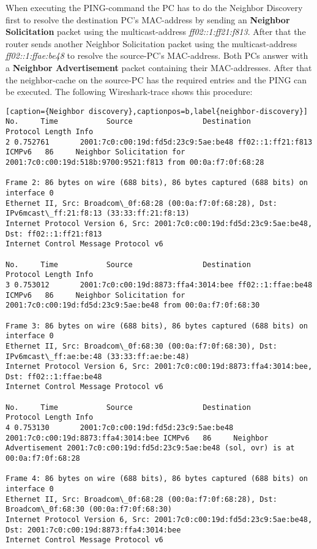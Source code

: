 When executing the PING-command the PC has to do the Neighbor Discovery first to resolve the destination PC's MAC-address by sending an \textbf{Neighbor Solicitation} packet using the multicast-address \textit{ff02::1:ff21:f813}. After that the router sends another Neighbor Solicitation packet using the multicast-address \textit{ff02::1:ffae:be48} to resolve the source-PC's MAC-address. Both PCs answer with a \textbf{Neighbor Advertisement} packet containing their MAC-addresses. After that the neighbor-cache on the source-PC has the required entries and the PING can be executed. The following Wireshark-trace shows this procedure:\\
\begin{lstlisting}[caption={Neighbor discovery},captionpos=b,label{neighbor-discovery}]
No.     Time           Source                Destination           Protocol Length Info
2 0.752761       2001:7c0:c00:19d:fd5d:23c9:5ae:be48 ff02::1:ff21:f813     ICMPv6   86     Neighbor Solicitation for 2001:7c0:c00:19d:518b:9700:9521:f813 from 00:0a:f7:0f:68:28

Frame 2: 86 bytes on wire (688 bits), 86 bytes captured (688 bits) on interface 0
Ethernet II, Src: Broadcom\_0f:68:28 (00:0a:f7:0f:68:28), Dst: IPv6mcast\_ff:21:f8:13 (33:33:ff:21:f8:13)
Internet Protocol Version 6, Src: 2001:7c0:c00:19d:fd5d:23c9:5ae:be48, Dst: ff02::1:ff21:f813
Internet Control Message Protocol v6

No.     Time           Source                Destination           Protocol Length Info
3 0.753012       2001:7c0:c00:19d:8873:ffa4:3014:bee ff02::1:ffae:be48     ICMPv6   86     Neighbor Solicitation for 2001:7c0:c00:19d:fd5d:23c9:5ae:be48 from 00:0a:f7:0f:68:30

Frame 3: 86 bytes on wire (688 bits), 86 bytes captured (688 bits) on interface 0
Ethernet II, Src: Broadcom\_0f:68:30 (00:0a:f7:0f:68:30), Dst: IPv6mcast\_ff:ae:be:48 (33:33:ff:ae:be:48)
Internet Protocol Version 6, Src: 2001:7c0:c00:19d:8873:ffa4:3014:bee, Dst: ff02::1:ffae:be48
Internet Control Message Protocol v6

No.     Time           Source                Destination           Protocol Length Info
4 0.753130       2001:7c0:c00:19d:fd5d:23c9:5ae:be48 2001:7c0:c00:19d:8873:ffa4:3014:bee ICMPv6   86     Neighbor Advertisement 2001:7c0:c00:19d:fd5d:23c9:5ae:be48 (sol, ovr) is at 00:0a:f7:0f:68:28

Frame 4: 86 bytes on wire (688 bits), 86 bytes captured (688 bits) on interface 0
Ethernet II, Src: Broadcom\_0f:68:28 (00:0a:f7:0f:68:28), Dst: Broadcom\_0f:68:30 (00:0a:f7:0f:68:30)
Internet Protocol Version 6, Src: 2001:7c0:c00:19d:fd5d:23c9:5ae:be48, Dst: 2001:7c0:c00:19d:8873:ffa4:3014:bee
Internet Control Message Protocol v6


\end{lstlisting}
